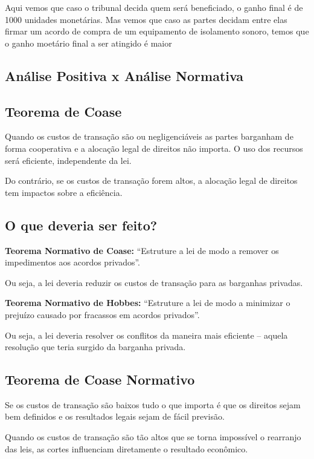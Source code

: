 \documentclass[a4paper,12pt]{article}[abntex2]
\begin{document}
Aqui vemos que caso o tribunal decida quem será beneficiado, o ganho final é de 1000 unidades monetárias. Mas vemos que caso as partes decidam entre elas firmar um acordo de compra de um equipamento de isolamento sonoro, temos que o ganho moetário final a ser atingido é maior 

\subsection{\textbf{Análise Positiva x Análise Normativa}}


\subsection{\textbf{Teorema de Coase}}

Quando os custos de transação são ou negligenciáveis as partes barganham de forma cooperativa e a alocação legal de direitos não importa. O uso dos recursos será eficiente, independente da lei.

Do contrário, se os custos de transação forem altos, a alocação legal de direitos tem impactos sobre a eficiência. 

\subsection{\textbf{O que deveria ser feito?}}
\textbf{Teorema Normativo de Coase: }
“Estruture a lei de modo a remover os impedimentos aos acordos privados”. 

Ou seja, a lei deveria reduzir os custos de transação para as barganhas privadas. 

\textbf{Teorema Normativo de Hobbes:}
“Estruture a lei de modo a minimizar o prejuízo causado por fracassos em acordos privados”.

Ou seja, a lei deveria resolver os conflitos da maneira mais eficiente – aquela resolução que teria surgido da barganha privada. 

\subsection{\textbf{Teorema de Coase Normativo}}
Se os custos de transação são baixos tudo o que importa é que os direitos sejam bem definidos e os resultados legais sejam de fácil previsão.

Quando os custos de transação são tão altos que se torna impossível o rearranjo das leis, as cortes influenciam diretamente o resultado econômico. 
\end{document}
